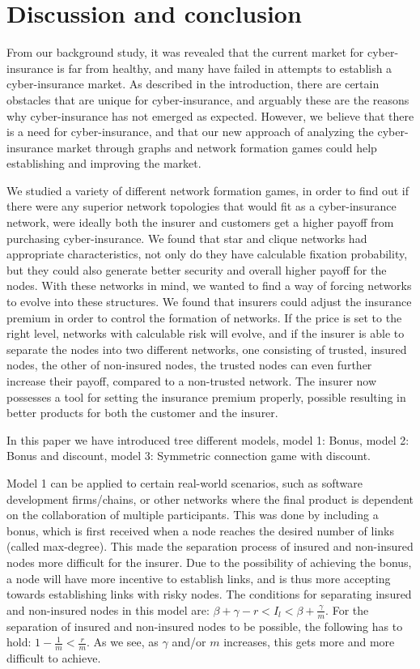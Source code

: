 \section{Discussion and conclusion}
From our background study, it was revealed that the current market for cyber-insurance is far from healthy, and many have failed in attempts to establish a cyber-insurance market.
As described in the introduction, there are certain obstacles that are unique for cyber-insurance, and arguably these are the reasons why cyber-insurance has not emerged as expected. 
 However, we believe that there is a need for cyber-insurance, and that our new approach of analyzing the cyber-insurance market through graphs and network formation games could help establishing and improving the market.

We studied a variety of different network formation games, in order to find out if there were any superior network topologies that would fit as a cyber-insurance network, were ideally both the insurer and customers get a higher payoff from purchasing cyber-insurance. 
We found that star and clique networks had appropriate characteristics, not only do they have calculable fixation probability, but they could also generate better security and overall higher payoff for the nodes. With these networks in mind, we wanted to find a way of forcing networks to evolve into these structures.  We found that insurers could adjust the insurance premium in order to control the formation of networks. If the price is set to the right level, networks with calculable risk will evolve, and if the insurer is able to separate the nodes into two different networks, one consisting of trusted, insured nodes, the other of non-insured nodes, the trusted nodes can even further increase their payoff, compared to a non-trusted network. The insurer now possesses a tool for setting the insurance premium properly, possible resulting in better products for both the customer and the insurer.

In this paper we have introduced tree different models, model 1: Bonus, model 2: Bonus and discount, model 3: Symmetric connection game with discount.

Model 1 can be applied to certain real-world scenarios, such as software development firms/chains, or other networks where the final product is dependent on the collaboration of multiple participants.
This was done by including a bonus, which is first received when a node reaches the desired number of links (called max-degree). This made the separation process of insured and non-insured nodes more difficult for the insurer. Due to the possibility of achieving the bonus, a node will have more incentive to establish links, and is thus more accepting towards establishing links with risky nodes. The conditions for separating insured and non-insured nodes in this model are: $\beta+\gamma-r<I_{l}<\beta+\frac{\gamma}{m}$. For the separation of insured and non-insured nodes to be possible, the following has to hold: $1-\frac{1}{m}<\frac{r}{m}$. As we see, as $\gamma$ and/or $m$ increases, this gets more and more difficult to achieve. 

